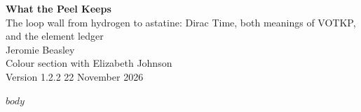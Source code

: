 \documentclass[11pt]{article}
\begin{document}
\begin{center}{\LARGE\bfseries What the Peel Keeps}\\[4pt]{\large The loop wall from hydrogen to astatine: Dirac Time, both meanings of VOTKP, and the element ledger}\\[10pt]{\large Jeromie Beasley}\\[2pt]{\small Colour section with Elizabeth Johnson}\\[2pt]{\small Version 1.2.2 \textperiodcentered{} 22 November 2026}\end{center}\vspace{6pt}
$body$
\end{document}
